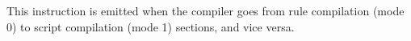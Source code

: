 This instruction is emitted when the compiler goes from rule compilation
(mode 0) to script compilation (mode 1) sections, and vice versa.

